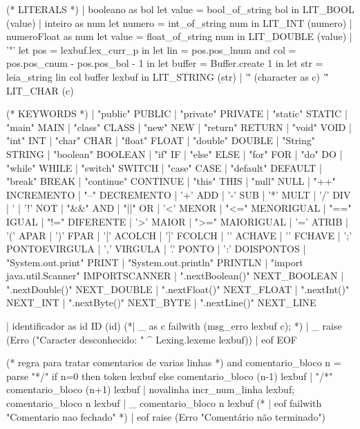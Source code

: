 \documentclass[12pt,a4paper,twoside]{report}
\begin{document}
\begin{terminal}
  (* LITERALS *)
  | booleano as bol { let value = bool_of_string bol in
                    LIT_BOOL (value) }
  | inteiro as num { let numero = int_of_string num in
                   LIT_INT (numero) }
  | numeroFloat as num { let value = float_of_string num in LIT_DOUBLE (value) }
  | '"'  { let pos = lexbuf.lex_curr_p in
           let lin = pos.pos_lnum
           and col = pos.pos_cnum - pos.pos_bol - 1 in
           let buffer = Buffer.create 1 in
           let str = leia_string lin col buffer lexbuf in
           LIT_STRING (str) }
  | '\'' (character as c) '\'' { LIT_CHAR (c) }

  (* KEYWORDS *)
  | "public" { PUBLIC }
  | "private" { PRIVATE }
  | "static" { STATIC }
  | "main" { MAIN }
  | "class" { CLASS }
  | "new" { NEW }
  | "return" { RETURN }
  | "void" { VOID }
  | "int" { INT }
  | "char" { CHAR }
  | "float" { FLOAT }
  | "double" { DOUBLE }
  | "String" { STRING }
  | "boolean" { BOOLEAN }
  | "if" { IF }
  | "else" { ELSE }
  | "for" { FOR }
  | "do" { DO }
  | "while" { WHILE }
  | "switch" { SWITCH }
  | "case" { CASE }
  | "default" { DEFAULT }
  | "break" { BREAK }
  | "continue" { CONTINUE }
  | "this" { THIS }
  | "null" { NULL }
  | "++" { INCREMENTO }
  | "--" { DECREMENTO }
  | '+' { ADD }
  | '-' { SUB }
  | '*' { MULT }
  | '/' { DIV }
  | '%
  | '!' { NOT }
  | "&&" { AND }
  | "||" { OR }
  | '<' { MENOR }
  | "<=" { MENORIGUAL }
  | "==" { IGUAL }
  | "!=" { DIFERENTE }
  | '>' { MAIOR }
  | ">=" { MAIORIGUAL }
  | '=' { ATRIB }
  | '(' { APAR }
  | ')' { FPAR }
  | '[' { ACOLCH }
  | ']' { FCOLCH }
  | '{' { ACHAVE }
  | '}' { FCHAVE }
  | ';' { PONTOEVIRGULA }
  | ',' { VIRGULA }
  | '.' { PONTO }
  | ':' { DOISPONTOS }
  | "System.out.print" { PRINT }
  | "System.out.println" { PRINTLN }
  | "import java.util.Scanner" { IMPORTSCANNER }
  | ".nextBoolean()" { NEXT_BOOLEAN }
  | ".nextDouble()" { NEXT_DOUBLE }
  | ".nextFloat()" { NEXT_FLOAT }
  | ".nextInt()" { NEXT_INT }
  | ".nextByte()" { NEXT_BYTE }
  | ".nextLine()" { NEXT_LINE }


  | identificador as id { ID (id) }
  (*| _ as c { failwith (msg_erro lexbuf c); }*)
  | _  { raise (Erro ("Caracter desconhecido: " ^ Lexing.lexeme lexbuf)) }
  | eof { EOF } 

(* regra para tratar comentarios de varias linhas *)
and comentario_bloco n = parse
    "*/"  { if n=0 then token lexbuf
           else comentario_bloco (n-1) lexbuf }
  | "/*"  { comentario_bloco (n+1) lexbuf }
  | novalinha { incr_num_linha lexbuf; comentario_bloco n lexbuf }
  | _     { comentario_bloco n lexbuf }
 (* | eof   { failwith "Comentario nao fechado" }*)
  | eof     { raise (Erro "Comentário não terminado") }


\end{terminal}
\end{document}
